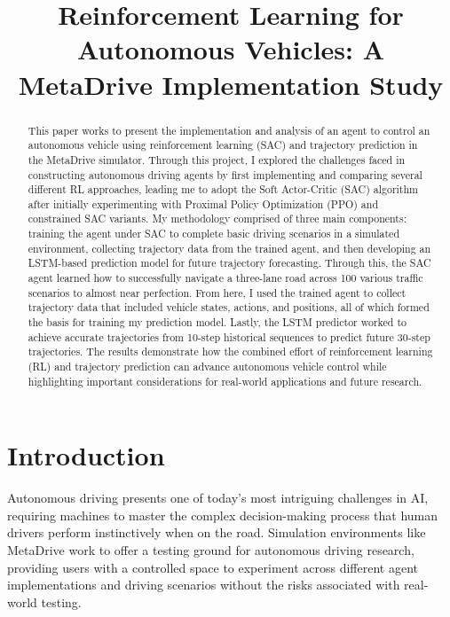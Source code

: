 \documentclass[10pt]{IEEEtran}
\begin{document}
\title{Reinforcement Learning for Autonomous Vehicles: A MetaDrive Implementation Study\\
}

\author{
}

\maketitle

\begin{abstract}
This paper works to present the implementation and analysis of an agent to control an autonomous vehicle using reinforcement learning (SAC) and trajectory prediction in the MetaDrive simulator. Through this project, I explored the challenges faced in constructing autonomous driving agents by first implementing and comparing several different RL approaches, leading me to adopt the Soft Actor-Critic (SAC) algorithm after initially experimenting with Proximal Policy Optimization (PPO) and constrained SAC variants. My methodology comprised of three main components: training the agent under SAC to complete basic driving scenarios in a simulated environment, collecting trajectory data from the trained agent, and then developing an LSTM-based prediction model for future trajectory forecasting. Through this, the SAC agent learned how to successfully navigate a three-lane road across 100 various traffic scenarios to almost near perfection. From here, I used the trained agent to collect trajectory data that included vehicle states, actions, and positions, all of which formed the basis for training my prediction model. Lastly, the LSTM predictor worked to achieve accurate trajectories from 10-step historical sequences to predict future 30-step trajectories. The results demonstrate how the combined effort of reinforcement learning (RL) and trajectory prediction can advance autonomous vehicle control while highlighting important considerations for real-world applications and future research.\end{abstract}

\section{Introduction}
Autonomous driving presents one of today's most intriguing challenges in AI, requiring machines to master the complex decision-making process that human drivers perform instinctively when on the road. Simulation environments like MetaDrive work to offer a testing ground for autonomous driving research, providing users with a controlled space to experiment across different agent implementations and driving scenarios without the risks associated with real-world testing.
\end{document}
